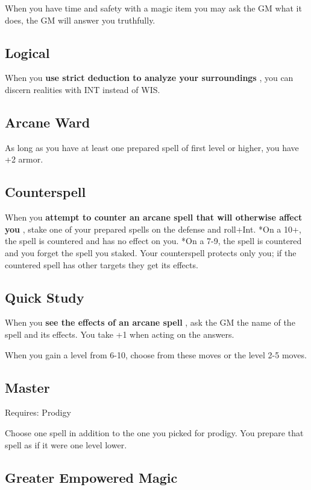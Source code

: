  When you have time and safety with a magic item you may ask the GM what it does, the GM will answer you truthfully.
\subsection{Logical}


 When you \textbf{use strict deduction to analyze your surroundings}
, you can discern realities with INT instead of WIS.
\subsection{Arcane Ward}


 As long as you have at least one prepared spell of first level or higher, you have +2 armor.
\subsection{Counterspell}


 When you \textbf{attempt to counter an arcane spell that will otherwise affect you}
, stake one of your prepared spells on the defense and roll+Int. *On a 10+, the spell is countered and has no effect on you. *On a 7-9, the spell is countered and you forget the spell you staked. Your counterspell protects only you; if the countered spell has other targets they get its effects.
\subsection{Quick Study}


 When you \textbf{see the effects of an arcane spell}
, ask the GM the name of the spell and its effects. You take +1 when acting on the answers.


\vspace{\baselineskip}
 {\Large When you gain a level from 6-10, choose from these moves or the level 2-5 moves.}
\subsection{Master}


 Requires: Prodigy


 Choose one spell in addition to the one you picked for prodigy. You prepare that spell as if it were one level lower.
\subsection{Greater Empowered Magic}


